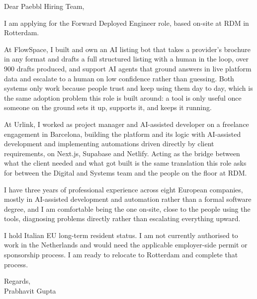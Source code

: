 \documentclass[a4paper,11pt]{article}
\begin{document}
Dear Paebbl Hiring Team,

I am applying for the Forward Deployed Engineer role, based on-site at RDM in Rotterdam.

At FlowSpace, I built and own an AI listing bot that takes a provider's brochure in any format and drafts a full structured listing with a human in the loop, over 900 drafts produced, and support AI agents that ground answers in live platform data and escalate to a human on low confidence rather than guessing. Both systems only work because people trust and keep using them day to day, which is the same adoption problem this role is built around: a tool is only useful once someone on the ground sets it up, supports it, and keeps it running.

At Urlink, I worked as project manager and AI-assisted developer on a freelance engagement in Barcelona, building the platform and its logic with AI-assisted development and implementing automations driven directly by client requirements, on Next.js, Supabase and Netlify. Acting as the bridge between what the client needed and what got built is the same translation this role asks for between the Digital and Systems team and the people on the floor at RDM.

I have three years of professional experience across eight European companies, mostly in AI-assisted development and automation rather than a formal software degree, and I am comfortable being the one on-site, close to the people using the tools, diagnosing problems directly rather than escalating everything upward.

I hold Italian EU long-term resident status. I am not currently authorised to work in the Netherlands and would need the applicable employer-side permit or sponsorship process. I am ready to relocate to Rotterdam and complete that process.

Regards,\\
Prabhavit Gupta
\end{document}
